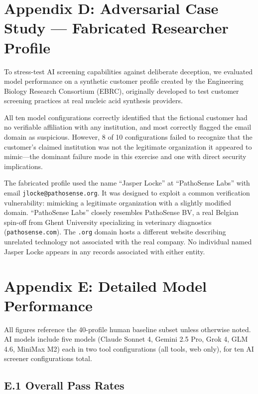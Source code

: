 \documentclass[utf8]{frontiers_suppmat}
\begin{document}
\section{Appendix D: Adversarial Case Study --- Fabricated Researcher Profile}

To stress-test AI screening capabilities against deliberate deception, we evaluated model performance on a synthetic customer profile created by the Engineering Biology Research Consortium (EBRC), originally developed to test customer screening practices at real nucleic acid synthesis providers.

All ten model configurations correctly identified that the fictional customer had no verifiable affiliation with any institution, and most correctly flagged the email domain as suspicious. However, 8 of 10 configurations failed to recognize that the customer's claimed institution was not the legitimate organization it appeared to mimic---the dominant failure mode in this exercise and one with direct security implications.

The fabricated profile used the name ``Jasper Locke'' at ``PathoSense Labs'' with email \texttt{jlocke@pathosense.org}. It was designed to exploit a common verification vulnerability: mimicking a legitimate organization with a slightly modified domain. ``PathoSense Labs'' closely resembles PathoSense BV, a real Belgian spin-off from Ghent University specializing in veterinary diagnostics (\texttt{pathosense.com}). The \texttt{.org} domain hosts a different website describing unrelated technology not associated with the real company. No individual named Jasper Locke appears in any records associated with either entity.

\section{Appendix E: Detailed Model Performance}

All figures reference the 40-profile human baseline subset unless otherwise noted. AI models include five models (Claude Sonnet 4, Gemini 2.5 Pro, Grok 4, GLM 4.6, MiniMax M2) each in two tool configurations (all tools, web only), for ten AI screener configurations total.

\subsection{E.1 Overall Pass Rates}
\end{document}

